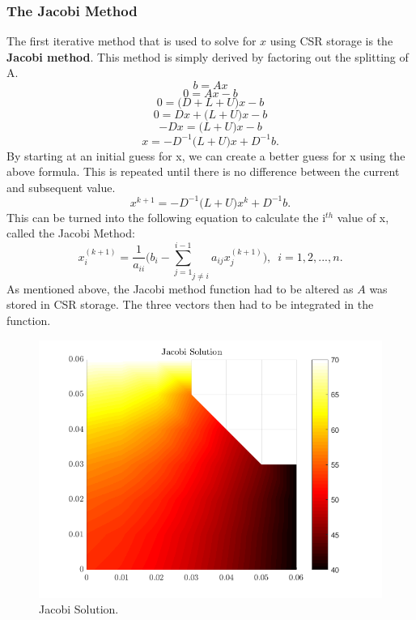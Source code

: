 \documentclass[12pt,a4paper]{article}
\begin{document}
\subsubsection{The Jacobi Method}
The first iterative method that is used to solve for $x$ using CSR storage is the \textbf{Jacobi method}. This method is simply derived by factoring out the splitting of A.
\[b=Ax\]
\[0=Ax-b\]
\[0=\big(D+L+U\big)x-b\]
\[0=Dx+\big(L+U\big)x-b\]
\[-Dx=\big(L+U\big)x-b\]
\[x=-D^{-1}\big(L+U\big)x+D^{-1}b.\]
By starting at an initial guess for x, we can create a better guess for x using the above formula. This is repeated until there is no difference between the current and subsequent value.
\[x^{k+1}=-D^{-1}\big(L+U\big)x^{k}+D^{-1}b.\]
This can be turned into the following equation to calculate the i$^{th}$ value of x, called the Jacobi Method:
\[x_{i}^{(k+1)} = \frac{1}{a_{ii}}\bigg(b_i-{\sum_{j=1}^{i-1}}_{j\neq i}a_{ij}x_{j}^{(k+1)}\bigg),\,\,\, i = 1, 2, ..., n.\]
As mentioned above, the Jacobi method function had to be altered as $A$ was stored in CSR storage. The three vectors then had to be integrated in the function. 
\begin{figure}[H]
	\includegraphics[width=\linewidth]{images/jacobisolution.png}
	\caption{Jacobi Solution.}
	\label{fig:jacobi}
\end{figure}
\end{document}

